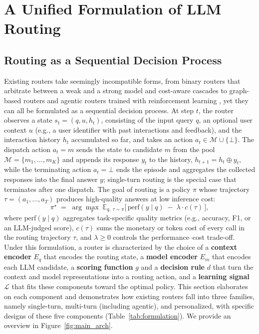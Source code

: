 \section{A Unified Formulation of LLM Routing}
\label{sec:formulation}

\subsection{Routing as a Sequential Decision Process}
\label{sec:general-router}
Existing routers take seemingly incompatible forms, from binary routers that arbitrate between a weak and a strong model \citep{ding2024hybrid, ong2024routellm} and cost-aware cascades \citep{chen2023frugalgpt, aggarwal2024automix} to graph-based routers \citep{feng2024graphrouter, yu2026tsrouter} and agentic routers trained with reinforcement learning \citep{zhang2025router}, yet they can all be formulated as a sequential decision process. At step $t$, the router observes a state $s_t = (q, u, h_t)$, consisting of the input query $q$, an optional user context $u$ (e.g., a user identifier with past interactions and feedback), and the interaction history $h_t$ accumulated so far, and takes an action $a_t \in \mathcal{M} \cup \{\bot\}$. The dispatch action $a_t = m$ sends the state to candidate $m$ from the pool $\mathcal{M} = \{m_1, \dots, m_K\}$ and appends its response $y_t$ to the history, $h_{t+1} = h_t \oplus y_t$, while the terminating action $a_t = \bot$ ends the episode and aggregates the collected responses into the final answer $y$; single-turn routing is the special case that terminates after one dispatch. The goal of routing is a policy $\pi$ whose trajectory $\tau = (a_1, \dots, a_T)$ produces high-quality answers at low inference cost:
\begin{equation}
    \pi^\star \;=\; \arg\max_{\pi}\;
    \mathbb{E}_{q,\; \tau \sim \pi}
    \big[\, \mathrm{perf}(y \mid q) \;-\; \lambda \cdot c(\tau) \,\big],
    \label{eq:objective}
\end{equation}
where $\mathrm{perf}(y \mid q)$ aggregates task-specific quality metrics (e.g., accuracy, F1, or an LLM-judged score), $c(\tau)$ sums the monetary or token cost of every call in the routing trajectory $\tau$, and $\lambda \geq 0$ controls the performance--cost trade-off. Under this formulation, a router is characterized by the choice of a \textbf{context encoder} $E_q$ that encodes the routing state, a \textbf{model encoder} $E_m$ that encodes each LLM candidate, a \textbf{scoring function} $g$ and a \textbf{decision rule} $d$ that turn the context and model representations into a routing action, and a \textbf{learning signal} $\mathcal{L}$ that fits these components toward the optimal policy. This section elaborates on each component and demonstrates how existing routers fall into three families, namely single-turn, multi-turn (including agentic), and personalized, with specific designs of these five components (Table~\ref{tab:formulation}). We provide an overview in Figure~\ref{fig:main_arch}.

